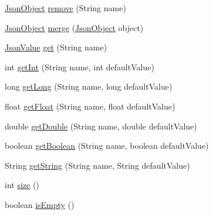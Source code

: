 \begin{DoxyCompactItemize}
\hyperlink{classcom_1_1ingeniigroup_1_1stratux_1_1_tools_1_1_json_micro_1_1_json_object}{Json\+Object} \hyperlink{classcom_1_1ingeniigroup_1_1stratux_1_1_tools_1_1_json_micro_1_1_json_object_a12f420acc06a673e3af565134a051aae}{remove} (String name)
\item 
\hyperlink{classcom_1_1ingeniigroup_1_1stratux_1_1_tools_1_1_json_micro_1_1_json_object}{Json\+Object} \hyperlink{classcom_1_1ingeniigroup_1_1stratux_1_1_tools_1_1_json_micro_1_1_json_object_a33e4862b982124e6dd4d62d179b0f1f1}{merge} (\hyperlink{classcom_1_1ingeniigroup_1_1stratux_1_1_tools_1_1_json_micro_1_1_json_object}{Json\+Object} object)
\item 
\hyperlink{classcom_1_1ingeniigroup_1_1stratux_1_1_tools_1_1_json_micro_1_1_json_value}{Json\+Value} \hyperlink{classcom_1_1ingeniigroup_1_1stratux_1_1_tools_1_1_json_micro_1_1_json_object_a5648ce3abe042b1a434664470bedc756}{get} (String name)
\item 
int \hyperlink{classcom_1_1ingeniigroup_1_1stratux_1_1_tools_1_1_json_micro_1_1_json_object_ae376b8a3200981de126fec81c3889d50}{get\+Int} (String name, int default\+Value)
\item 
long \hyperlink{classcom_1_1ingeniigroup_1_1stratux_1_1_tools_1_1_json_micro_1_1_json_object_ad1f031b0cf55dfec084eeecbbcf2e134}{get\+Long} (String name, long default\+Value)
\item 
float \hyperlink{classcom_1_1ingeniigroup_1_1stratux_1_1_tools_1_1_json_micro_1_1_json_object_a2045302012abc94aab8554062c12f991}{get\+Float} (String name, float default\+Value)
\item 
double \hyperlink{classcom_1_1ingeniigroup_1_1stratux_1_1_tools_1_1_json_micro_1_1_json_object_a6fdae7ae3cae6e5ddcc4bf714d231669}{get\+Double} (String name, double default\+Value)
\item 
boolean \hyperlink{classcom_1_1ingeniigroup_1_1stratux_1_1_tools_1_1_json_micro_1_1_json_object_a3f2a04af4d046b3b045aa46b2118b701}{get\+Boolean} (String name, boolean default\+Value)
\item 
String \hyperlink{classcom_1_1ingeniigroup_1_1stratux_1_1_tools_1_1_json_micro_1_1_json_object_a745cd48b660af1115bf57c150b71d1bd}{get\+String} (String name, String default\+Value)
\item 
int \hyperlink{classcom_1_1ingeniigroup_1_1stratux_1_1_tools_1_1_json_micro_1_1_json_object_a07835caf9822cba88538276bf50b0f8f}{size} ()
\item 
boolean \hyperlink{classcom_1_1ingeniigroup_1_1stratux_1_1_tools_1_1_json_micro_1_1_json_object_ac4765d8e47373b4a69719134a54f8a3f}{is\+Empty} ()

\end{DoxyCompactItemize}
